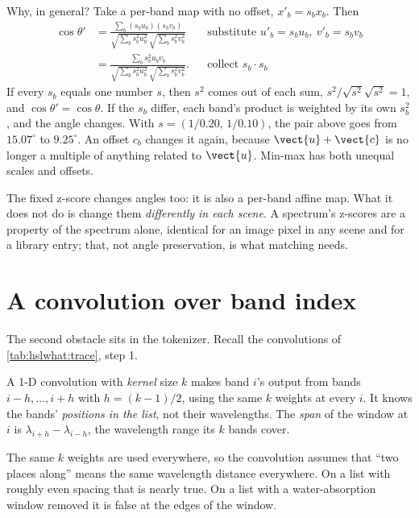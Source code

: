 Why, in general? Take a per-band map with no offset, $x'_b=s_bx_b$. Then
\begin{align*}
\cos\theta' &= \frac{\sum_b (s_bu_b)(s_bv_b)}{\sqrt{\sum_b s_b^2u_b^2}\,\sqrt{\sum_b s_b^2v_b^2}}
 && \text{substitute }u'_b=s_bu_b,\ v'_b=s_bv_b\\
&= \frac{\sum_b s_b^2u_bv_b}{\sqrt{\sum_b s_b^2u_b^2}\,\sqrt{\sum_b s_b^2v_b^2}} .
 && \text{collect } s_b\cdot s_b
\end{align*}
If every $s_b$ equals one number $s$, then $s^2$ comes out of each sum, $s^2/\sqrt{s^2}\sqrt{s^2}=1$, and
$\cos\theta'=\cos\theta$. If the $s_b$ differ, each band's product is weighted by its own $s_b^2$, and the angle changes.
With $s=(1/0.20,\,1/0.10)$, the pair above goes from $15.07^\circ$ to $9.25^\circ$\tagC. An offset $c_b$ changes it again,
because $\vect{u}+\vect{c}$ is no longer a multiple of anything related to $\vect{u}$. Min-max has both unequal scales
and offsets.

\begin{keypoint}
The fixed z-score changes angles too: it is also a per-band affine map. What it does not do is change them
\emph{differently in each scene}. A spectrum's z-scores are a property of the spectrum alone, identical for an image
pixel in any scene and for a library entry; that, not angle preservation, is what matching needs.
\end{keypoint}

\section{A convolution over band index}\label{sec:hslnorm:conv}

The second obstacle sits in the tokenizer. Recall the convolutions of \cref{tab:hslwhat:trace}, step 1.

\begin{definition}
A 1-D convolution with \emph{kernel} size $k$ makes band $i$'s output from bands $i-h,\dots,i+h$ with $h=(k-1)/2$,
using the same $k$ weights at every $i$. It knows the bands' \emph{positions in the list}, not their wavelengths. The
\emph{span} of the window at $i$ is $\lambda_{i+h}-\lambda_{i-h}$, the wavelength range its $k$ bands cover.
\end{definition}

The same $k$ weights are used everywhere, so the convolution assumes that ``two places along'' means the same
wavelength distance everywhere. On a list with roughly even spacing that is nearly true. On a list with a
water-absorption window removed it is false at the edges of the window.

